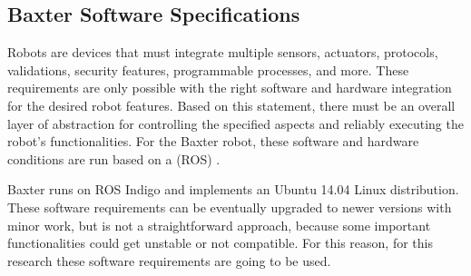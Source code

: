 \documentclass[11pt]{report} %
\begin{document}
\begin{table}[H]
\begin{center}
\caption{\label{tab:additional_specifications} Additional specifications for Baxter robot. Adapted from \citep{cite_baxter_hardware_specifications}.}
\end{center}
\end{table}


\subsection{Baxter Software Specifications}

Robots are devices that must integrate multiple sensors, actuators, protocols, validations, security features, programmable processes, and more. These requirements are only possible with the right software and hardware integration for the desired robot features. Based on this statement, there must be an overall layer of abstraction for controlling the specified aspects and reliably executing the robot's functionalities. For the Baxter robot, these software and hardware conditions are run based on a  (ROS) \citep{cite_ROS_official_site}.

Baxter runs on ROS Indigo and implements an Ubuntu 14.04 Linux distribution. These software requirements can be eventually upgraded to newer versions with minor work, but is not a straightforward approach, because some important functionalities could get unstable or not compatible. For this reason, for this research these software requirements are going to be used.\\
\end{document}
